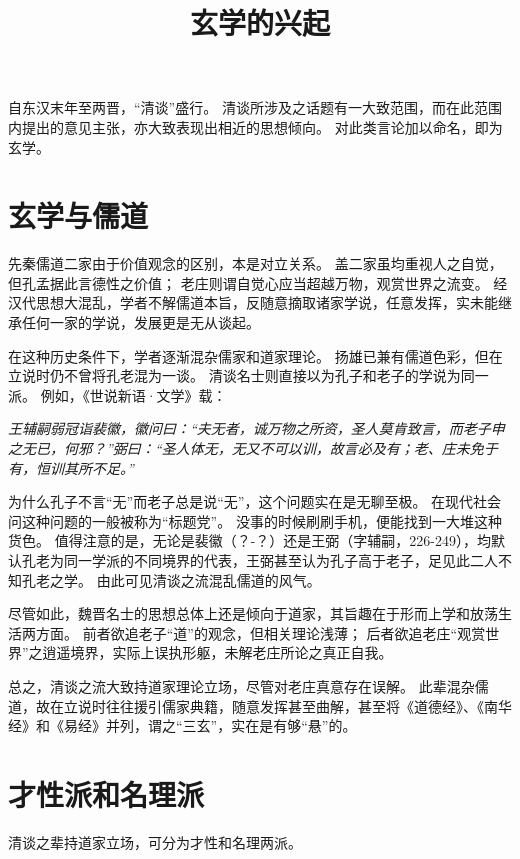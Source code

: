 \documentclass[11pt]{article}
\title{玄学的兴起}
\date{}
\begin{document}
\maketitle

\linenumbers

自东汉末年至两晋，“清谈”盛行。
清谈所涉及之话题有一大致范围，而在此范围内提出的意见主张，亦大致表现出相近的思想倾向。
对此类言论加以命名，即为玄学。

\section{玄学与儒道}
先秦儒道二家由于价值观念的区别，本是对立关系。
盖二家虽均重视人之自觉，但孔孟据此言德性之价值；
老庄则谓自觉心应当超越万物，观赏世界之流变。
经汉代思想大混乱，学者不解儒道本旨，反随意摘取诸家学说，任意发挥，实未能继承任何一家的学说，发展更是无从谈起。

\par

在这种历史条件下，学者逐渐混杂儒家和道家理论。
扬雄已兼有儒道色彩，但在立说时仍不曾将孔老混为一谈。
清谈名士则直接以为孔子和老子的学说为同一派。
例如，《世说新语·文学》载：

\textit{王辅嗣弱冠诣裴徽，徽问曰：“夫无者，诚万物之所资，圣人莫肯致言，而老子申之无已，何邪？”弼曰：“圣人体无，无又不可以训，故言必及有；老、庄未免于有，恒训其所不足。”}

为什么孔子不言“无”而老子总是说“无”，这个问题实在是无聊至极。
在现代社会问这种问题的一般被称为“标题党”。
没事的时候刷刷手机，便能找到一大堆这种货色。
值得注意的是，无论是裴徽（？-？）还是王弼（字辅嗣，226-249），均默认孔老为同一学派的不同境界的代表，王弼甚至认为孔子高于老子，足见此二人不知孔老之学。
由此可见清谈之流混乱儒道的风气。

\par

尽管如此，魏晋名士的思想总体上还是倾向于道家，其旨趣在于形而上学和放荡生活两方面。
前者欲追老子“道”的观念，但相关理论浅薄；
后者欲追老庄“观赏世界”之逍遥境界，实际上误执形躯，未解老庄所论之真正自我。

\par

总之，清谈之流大致持道家理论立场，尽管对老庄真意存在误解。
此辈混杂儒道，故在立说时往往援引儒家典籍，随意发挥甚至曲解，甚至将《道德经》、《南华经》和《易经》并列，谓之“三玄”，实在是有够“悬”的。

\section{才性派和名理派}
清谈之辈持道家立场，可分为才性和名理两派。
\end{document}
